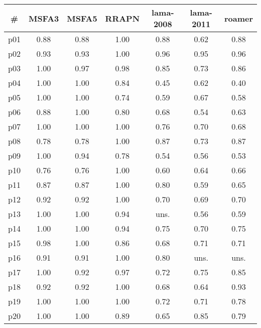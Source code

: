 \begin{tabular}{ccccccc}
\toprule
\textbf{\#} & \textbf{MSFA3} & \textbf{MSFA5} & \textbf{RRAPN} & \textbf{lama-2008} & \textbf{lama-2011} & \textbf{roamer}\\
\midrule
p01 & 0.88 & 0.88 & 1.00 & 0.88 & 0.62 & 0.88\\
p02 & 0.93 & 0.93 & 1.00 & 0.96 & 0.95 & 0.96\\
p03 & 1.00 & 0.97 & 0.98 & 0.85 & 0.73 & 0.86\\
p04 & 1.00 & 1.00 & 0.84 & 0.45 & 0.62 & 0.40\\
p05 & 1.00 & 1.00 & 0.74 & 0.59 & 0.67 & 0.58\\
p06 & 0.88 & 1.00 & 0.80 & 0.68 & 0.54 & 0.63\\
p07 & 1.00 & 1.00 & 1.00 & 0.76 & 0.70 & 0.68\\
p08 & 0.78 & 0.78 & 1.00 & 0.87 & 0.73 & 0.87\\
p09 & 1.00 & 0.94 & 0.78 & 0.54 & 0.56 & 0.53\\
p10 & 0.76 & 0.76 & 1.00 & 0.60 & 0.64 & 0.66\\
p11 & 0.87 & 0.87 & 1.00 & 0.80 & 0.59 & 0.65\\
p12 & 0.92 & 0.92 & 1.00 & 0.70 & 0.69 & 0.70\\
p13 & 1.00 & 1.00 & 0.94 & uns. & 0.56 & 0.59\\
p14 & 1.00 & 1.00 & 0.94 & 0.75 & 0.70 & 0.75\\
p15 & 0.98 & 1.00 & 0.86 & 0.68 & 0.71 & 0.71\\
p16 & 0.91 & 0.91 & 1.00 & 0.80 & uns. & uns.\\
p17 & 1.00 & 0.92 & 0.97 & 0.72 & 0.75 & 0.85\\
p18 & 0.92 & 0.92 & 1.00 & 0.68 & 0.64 & 0.93\\
p19 & 1.00 & 1.00 & 1.00 & 0.72 & 0.71 & 0.78\\
p20 & 1.00 & 1.00 & 0.89 & 0.65 & 0.85 & 0.79\\
\bottomrule
\end{tabular}

